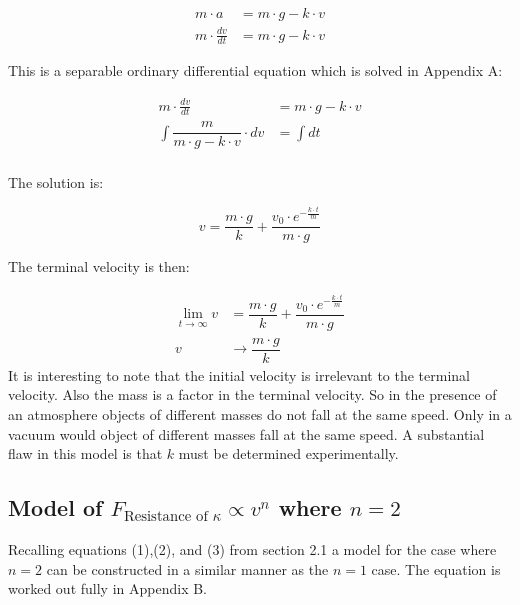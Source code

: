 \documentclass[12pt,letterpaper,final]{article}
\begin{document}
\begin{equation}
\begin{align}
			m \cdot a &= m \cdot g - k \cdot v\\
m\cdot \tfrac{dv}{dt} &= m \cdot g - k \cdot v
\end{align}
\end{equation}

This is a separable ordinary differential equation which is solved in Appendix A:

\begin{equation}
\begin{align}
					m\cdot\tfrac{dv}{dt} &= m \cdot g - k \cdot v\\				
\int\dfrac{m}{m \cdot g - k \cdot v}\cdot dv &= \int dt\\
\end{align}
\end{equation}

The solution is:

\begin{equation}
v = \dfrac{m \cdot g}{k} + \dfrac{v_{0}\cdot \textit{e}^{-\tfrac{k \cdot t}{m}}}{m \cdot g}
\end{equation}

The terminal velocity is then:

\begin{equation}
\begin{align}
\lim_{t \to \infty} v &= \dfrac{m \cdot g}{k} + \dfrac{v_{0}\cdot \textit{e}^{-\tfrac{k \cdot t}{m}}}{m \cdot g}\\
					v &\to \dfrac{m \cdot g}{k}
\end{align}
\end{equation}
It is interesting to note that the initial velocity is irrelevant to the terminal velocity. Also the mass is a factor in the terminal velocity. So in the presence of an atmosphere objects of different masses do not fall at the same speed. Only in a vacuum would object of different masses fall at the same speed. A substantial flaw in this model is that $k$ must be determined experimentally.\\

\subsection{Model of $F_{\text{Resistance of }\kappa} \propto v^{n}$ where $n = 2$}

Recalling equations (1),(2), and (3) from section 2.1 a model for the case where $n = 2$ can be constructed in a similar manner as the $n = 1$ case. The equation is worked out fully in Appendix B.
\end{document}
